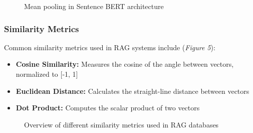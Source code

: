 \documentclass[12pt]{article}
\begin{document}
    \begin{figure}[h!]
        \vspace{1cm}
        \centering
        \caption{Mean pooling in Sentence BERT architecture \cite{prompt_engineering}}
    \end{figure}

    \newpage
    \subsubsection{Similarity Metrics}
    Common similarity metrics used in RAG systems include (\textit{Figure 5}):
    \begin{itemize}
    \item \textbf{Cosine Similarity:} Measures the cosine of the angle between vectors, normalized to [-1, 1]
    \item \textbf{Euclidean Distance:} Calculates the straight-line distance between vectors
    \item \textbf{Dot Product:} Computes the scalar product of two vectors
    \end{itemize}


    \begin{figure}[h!]
        \vspace{1cm}
        \centering
        \caption{Overview of different similarity metrics used in RAG databases \cite{rag_metrics}}
    \end{figure}
\end{document}
